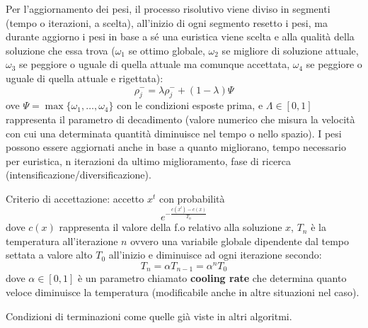 Per l'aggiornamento dei pesi, il processo risolutivo viene diviso in segmenti (tempo o iterazioni, a scelta), all'inizio di ogni segmento resetto i pesi, ma durante aggiorno i pesi in base a sé una euristica viene scelta e alla qualità della soluzione che essa trova ($\omega_1$ se ottimo globale, $\omega_2$ se migliore di soluzione attuale, $\omega_3$ se peggiore o uguale di quella attuale ma comunque accettata, $\omega_4$ se peggiore o uguale di quella attuale e rigettata):
\begin{equation*}
	\rho_j^-=\lambda \rho_j^-+(1-\lambda)\Psi
\end{equation*}
ove $\Psi=\max \{\omega_1,\dots, \omega_4\}$ con le condizioni esposte prima, e $\Lambda\in [0,1]$ rappresenta il parametro di decadimento (valore numerico che misura la velocità con cui una determinata quantità diminuisce nel tempo o nello spazio). I pesi possono essere aggiornati anche in base a quanto migliorano, tempo necessario per euristica, n iterazioni da ultimo miglioramento, fase di ricerca (intensificazione/diversificazione). 

Criterio di accettazione: accetto $x^t$ con probabilità
\begin{equation*}
	e^{-\frac{c(x^t)-c(x)}{T_n}}
\end{equation*}
dove $c(x)$ rappresenta il valore della f.o relativo alla soluzione $x$, $T_n$ è la temperatura all'iterazione $n$ ovvero una variabile globale dipendente dal tempo settata a valore alto $T_0$ all'inizio e diminuisce ad ogni iterazione secondo:
\begin{equation*}
	T_n=\alpha T_{n-1}=\alpha^nT_0
\end{equation*}
dove $\alpha\in [0,1]$ è un parametro chiamato \textbf{cooling rate} che determina quanto veloce diminuisce la temperatura (modificabile anche in altre situazioni nel caso). 

Condizioni di terminazioni come quelle già viste in altri algoritmi.